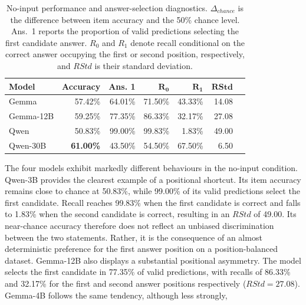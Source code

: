 \begin{table}[h]
    \centering
    \small
    \begin{tabular}{lrrrrrr}
        \hline
        \textbf{Model} &
        \textbf{Accuracy} &
        \textbf{Ans. 1} &
        $\mathbf{R_0}$ &
        $\mathbf{R_1}$ &
        $\mathbf{RStd}$ \\
        \hline
        Gemma
        & 57.42\%
        & 64.01\%
        & 71.50\%
        & 43.33\%
        & 14.08 \\

        Gemma-12B
        & 59.25\%
        & 77.35\%
        & 86.33\%
        & 32.17\%
        & 27.08 \\

        Qwen
        & 50.83\%
        & 99.00\%
        & 99.83\%
        & 1.83\%
        & 49.00 \\

        Qwen-30B
        & \textbf{61.00\%}
        & 43.50\%
        & 54.50\%
        & 67.50\%
        & 6.50 \\
        \hline
    \end{tabular}
    \caption{No-input performance and answer-selection diagnostics.
    $\Delta_{chance}$ is the difference between item accuracy and the 50\%
    chance level. Ans.~1 reports the proportion of valid predictions selecting
    the first candidate answer. $R_0$ and $R_1$ denote recall conditional on
    the correct answer occupying the first or second position, respectively,
    and $RStd$ is their standard deviation.}
    \label{tab:no_input_bias}
\end{table}
The four models exhibit markedly different behaviours in the no-input
condition. Qwen-3B provides the clearest example of a positional shortcut. Its
item accuracy remains close to chance at 50.83\%, while 99.00\% of its valid
predictions select the first candidate. Recall reaches 99.83\% when the first
candidate is correct and falls to 1.83\% when the second candidate is correct,
resulting in an $RStd$ of 49.00. Its near-chance accuracy therefore does not
reflect an unbiased discrimination between the two statements. Rather, it is
the consequence of an almost deterministic preference for the first answer
position on a position-balanced dataset.
Gemma-12B also displays a substantial positional asymmetry. The model selects
the first candidate in 77.35\% of valid predictions, with recalls of 86.33\%
and 32.17\% for the first and second answer positions respectively
($RStd = 27.08$). Gemma-4B    follows the same tendency, although less strongly,
